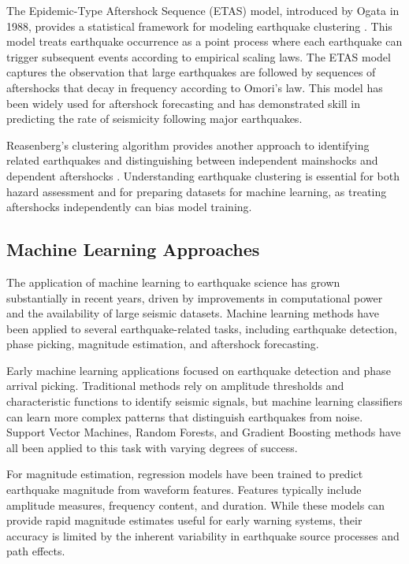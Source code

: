 The Epidemic-Type Aftershock Sequence (ETAS) model, introduced by Ogata in 1988, provides a statistical framework for modeling earthquake clustering \cite{ogata1988}. This model treats earthquake occurrence as a point process where each earthquake can trigger subsequent events according to empirical scaling laws. The ETAS model captures the observation that large earthquakes are followed by sequences of aftershocks that decay in frequency according to Omori's law. This model has been widely used for aftershock forecasting and has demonstrated skill in predicting the rate of seismicity following major earthquakes.

Reasenberg's clustering algorithm provides another approach to identifying related earthquakes and distinguishing between independent mainshocks and dependent aftershocks \cite{reasenberg1985}. Understanding earthquake clustering is essential for both hazard assessment and for preparing datasets for machine learning, as treating aftershocks independently can bias model training.

\subsection{Machine Learning Approaches}

The application of machine learning to earthquake science has grown substantially in recent years, driven by improvements in computational power and the availability of large seismic datasets. Machine learning methods have been applied to several earthquake-related tasks, including earthquake detection, phase picking, magnitude estimation, and aftershock forecasting.

Early machine learning applications focused on earthquake detection and phase arrival picking. Traditional methods rely on amplitude thresholds and characteristic functions to identify seismic signals, but machine learning classifiers can learn more complex patterns that distinguish earthquakes from noise. Support Vector Machines, Random Forests, and Gradient Boosting methods have all been applied to this task with varying degrees of success.

For magnitude estimation, regression models have been trained to predict earthquake magnitude from waveform features. Features typically include amplitude measures, frequency content, and duration. While these models can provide rapid magnitude estimates useful for early warning systems, their accuracy is limited by the inherent variability in earthquake source processes and path effects.

